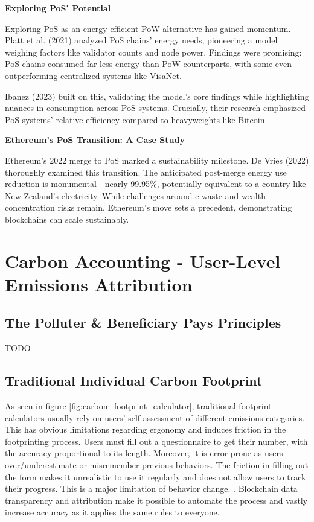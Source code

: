 \documentclass[11pt]{report}
\begin{document}
\textbf{Exploring PoS' Potential}

Exploring PoS as an energy-efficient PoW alternative has gained momentum. Platt et al. (2021)\cite{plattEnergyFootprintBlockchain2021} analyzed PoS chains' energy needs, pioneering a model weighing factors like validator counts and node power. Findings were promising: PoS chains consumed far less energy than PoW counterparts, with some even outperforming centralized systems like VisaNet.

Ibanez (2023) built on this, validating the model's core findings while highlighting nuances in consumption across PoS systems. Crucially, their research emphasized PoS systems' relative efficiency compared to heavyweights like Bitcoin.

\textbf{Ethereum's PoS Transition: A Case Study}

Ethereum's 2022 merge to PoS marked a sustainability milestone. De Vries (2022)\cite{devriesCryptocurrenciesRoadSustainability2022} thoroughly examined this transition. The anticipated post-merge energy use reduction is monumental - nearly 99.95\%, potentially equivalent to a country like New Zealand's electricity. While challenges around e-waste and wealth concentration risks remain, Ethereum's move sets a precedent, demonstrating blockchains can scale sustainably.

\section{Carbon Accounting - User-Level Emissions Attribution}

\subsection{The Polluter \& Beneficiary Pays Principles}

{\large{TODO}}

\subsection{Traditional Individual Carbon Footprint \label{se:traditional_footprint}}

As seen in figure \ref{fig:carbon_footprint_calculator}, traditional footprint calculators usually rely on users' self-assessment of different emissions categories. This has obvious limitations regarding ergonomy and induces friction in the footprinting process. Users must fill out a questionnaire to get their number, with the accuracy proportional to its length. Moreover, it is error prone as users over/underestimate or misremember previous behaviors. The friction in filling out the form makes it unrealistic to use it regularly and does not allow users to track their progress. This is a major limitation of behavior change. . Blockchain data transparency and attribution make it possible to automate the process and vastly increase accuracy as it applies the same rules to everyone.
\end{document}
